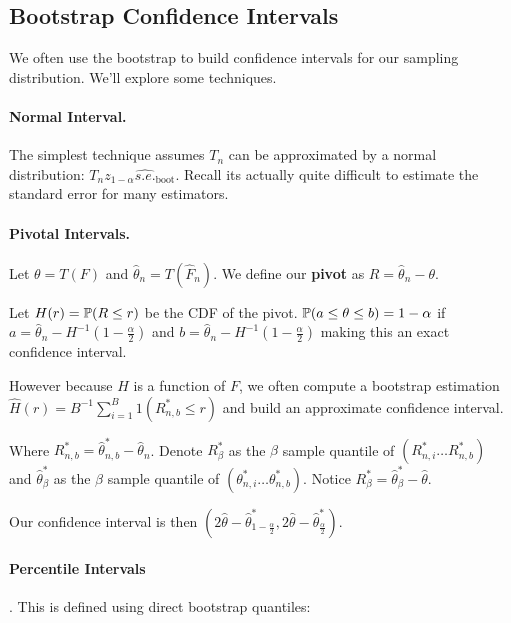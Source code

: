 \documentclass[10pt]{article}
\begin{document}
\subsection{Bootstrap Confidence Intervals}

We often use the bootstrap to build confidence intervals for our sampling
distribution. We'll explore some techniques.

\paragraph{Normal Interval.} The simplest technique assumes $T_n$ can be
approximated by a normal distribution: $T_n
z_{1-\alpha}\hat{s.e.}_{\text{boot}}$. Recall its actually quite difficult to
estimate the standard error for many estimators.

\paragraph{Pivotal Intervals.}

\begin{definition}
    Let $\theta = T(F)$ and $\hat{\theta}_n = T(\hat{F}_n)$. We define our
    \textbf{pivot} as $R = \hat{\theta}_n - \theta$.

    Let $H(r) = \P(R \leq r)$ be the CDF of the pivot. $\P(a \leq \theta \leq
    b) = 1 - \alpha$ if $a = \hat{\theta}_n - H^{-1}(1-\frac{\alpha}{2})$ and
    $b = \hat{\theta}_n - H^{-1}(1-\frac{\alpha}{2})$ making this an exact
    confidence interval.

    However because $H$ is a function of $F$, we often compute a bootstrap
    estimation $\hat{H}(r) = B^{-1}\sum_{i=1}^B 1(R^*_{n,b} \leq r)$ and build
    an approximate confidence interval.

    Where $R^*_{n,b} = \hat{\theta}^*_{n,b} - \hat{\theta}_n$.
    Denote $R^*_{\beta}$ as the $\beta$ sample quantile of $(R^*_{n,i} \dots
    R^*_{n,b})$ and $\hat{\theta}^*_{\beta}$ as the $\beta$ sample quantile of
    $(\theta^*_{n,i} \dots \theta^*_{n,b})$. Notice $R^*_{\beta} =
    \hat{\theta}^*_{\beta} - \hat{\theta}$.

    Our confidence interval is then
    $(2\hat{\theta}-\hat{\theta}^*_{1-\frac{\alpha}{2}},
    2\hat{\theta}-\hat{\theta}^*_{\frac{\alpha}{2}})$.
\end{definition}

\paragraph{Percentile Intervals}. This is defined using direct bootstrap
quantiles:
\end{document}
